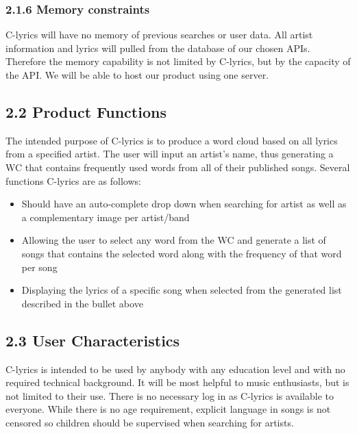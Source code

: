 \documentclass[]{article}
\begin{document}
\subsubsection{2.1.6 Memory constraints}\label{memory-constraints}

C-lyrics will have no memory of previous searches or user data. All
artist information and lyrics will pulled from the database of our
chosen APIs. Therefore the memory capability is not limited by C-lyrics,
but by the capacity of the API. We will be able to host our product
using one server.

\subsection{2.2 Product Functions}\label{product-functions}

The intended purpose of C-lyrics is to produce a word cloud based on all
lyrics from a specified artist. The user will input an artist's name,
thus generating a WC that contains frequently used words from all of
their published songs. Several functions C-lyrics are as follows:

\begin{itemize}
\itemsep1pt\parskip0pt
\item
  Should have an auto-complete drop down when searching for artist as
  well as a complementary image per artist/band
\item
  Allowing the user to select any word from the WC and generate a list
  of songs that contains the selected word along with the frequency of
  that word per song
\item
  Displaying the lyrics of a specific song when selected from the
  generated list described in the bullet above
\end{itemize}

\subsection{2.3 User Characteristics}\label{user-characteristics}

C-lyrics is intended to be used by anybody with any education level and
with no required technical background. It will be most helpful to music
enthusiasts, but is not limited to their use. There is no necessary log
in as C-lyrics is available to everyone. While there is no age
requirement, explicit language in songs is not censored so children
should be supervised when searching for artists.
\end{document}
